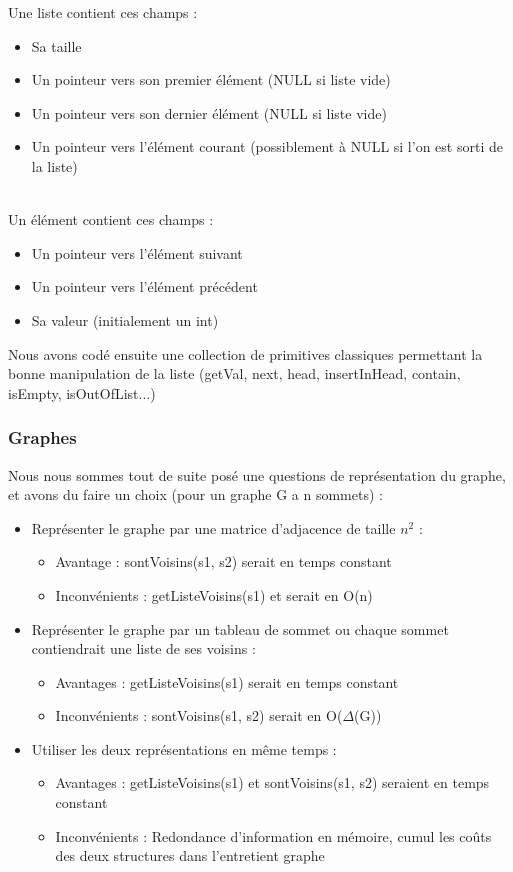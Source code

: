 \documentclass[a4paper,10pt]{article}
\newcommand*{\itemb}{\item[$\bullet$]}
\begin{document}
Une liste contient ces champs :
\begin{itemize}
\itemb Sa taille
\itemb Un pointeur vers son premier élément (NULL si liste vide)
\itemb Un pointeur vers son dernier élément (NULL si liste vide)
\itemb Un pointeur vers l'élément courant (possiblement à NULL si l'on est sorti de la liste)
\end{itemize}
~~\\
Un élément contient ces champs :
\begin{itemize}
\itemb Un pointeur vers l'élément suivant
\itemb Un pointeur vers l'élément précédent
\itemb Sa valeur (initialement un int)
\end{itemize}

Nous avons codé ensuite une collection de primitives classiques permettant la bonne manipulation de la liste (getVal, next, head, insertInHead, contain, isEmpty, isOutOfList...)

\subsubsection{Graphes}

Nous nous sommes tout de suite posé une questions de représentation du graphe, et avons du faire un choix (pour un graphe G a n sommets) :
\begin{itemize}
\itemb Représenter le graphe par une matrice d'adjacence de taille $n^2$ :
\begin{itemize}
\item Avantage : sontVoisins(s1, s2) serait en temps constant
\item Inconvénients : getListeVoisins(s1) et serait en O(n)
\end{itemize}
\itemb Représenter le graphe par un tableau de sommet ou chaque sommet contiendrait une liste de ses voisins :
\begin{itemize}
\item Avantages : getListeVoisins(s1) serait en temps constant
\item Inconvénients : sontVoisins(s1, s2) serait en O($\Delta$(G))
\end{itemize}
\itemb Utiliser les deux représentations en même temps :
\begin{itemize}
\item Avantages : getListeVoisins(s1) et sontVoisins(s1, s2) seraient en temps constant
\item Inconvénients : Redondance d'information en mémoire, cumul les coûts des deux structures dans l'entretient graphe
\end{itemize}
\end{itemize}
\end{document}
